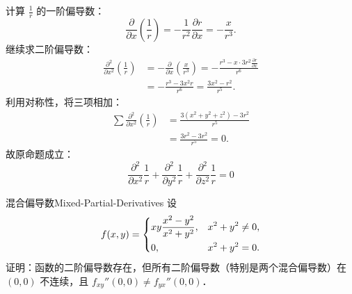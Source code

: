 \begin{myproof}
    计算 $\frac{1}{r}$ 的一阶偏导数：
    \begin{equation}
        \frac{\partial}{\partial x} \left( \frac{1}{r} \right) = -\frac{1}{r^2} \frac{\partial r}{\partial x} = -\frac{x}{r^3}.
    \end{equation}
    继续求二阶偏导数：
    \begin{equation}
        \begin{aligned}
            \frac{\partial^2}{\partial x^2} \left( \frac{1}{r} \right) & = -\frac{\partial}{\partial x} \left( \frac{x}{r^3} \right) = -\frac{r^3 - x \cdot 3r^2 \frac{\partial r}{\partial x}}{r^6} \\
                                                                       & = -\frac{r^3 - 3x^2 r}{r^6} = \frac{3x^2 - r^2}{r^5}.
        \end{aligned}
    \end{equation}
    利用对称性，将三项相加：
    \begin{equation}
        \begin{aligned}
            \sum \frac{\partial^2}{\partial x^2} \left( \frac{1}{r} \right) & = \frac{3(x^2 + y^2 + z^2) - 3r^2}{r^5} \\
                                                                            & = \frac{3r^2 - 3r^2}{r^5} = 0.
        \end{aligned}
    \end{equation}
    故原命题成立：
    \begin{equation}
        \boxed{\frac{\partial^2}{\partial x^2} \frac{1}{r} + \frac{\partial^2}{\partial y^2} \frac{1}{r} + \frac{\partial^2}{\partial z^2} \frac{1}{r} = 0}
    \end{equation}
\end{myproof}


\begin{problem}{混合偏导数}{Mixed-Partial-Derivatives}
    设
    \begin{equation}
        f(x, y) = \begin{dcases} xy \frac{x^2 - y^2}{x^2 + y^2}, & x^2 + y^2 \neq 0, \\ 0, & x^2 + y^2 = 0. \end{dcases}
    \end{equation}
    证明：函数的二阶偏导数存在，但所有二阶偏导数（特别是两个混合偏导数）在 $(0, 0)$ 不连续，且 $f_{xy}''(0, 0) \neq f_{yx}''(0, 0)$．
\end{problem}

